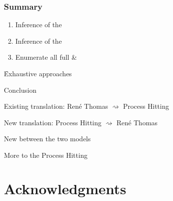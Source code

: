 
\begin{frame}[c]
  \frametitle{Summary}

\begin{enumerate}[1.]
  \item Inference of the 
  \item Inference of the 
  \item Enumerate all full \& 
\end{enumerate}
\quad\quad\f Exhaustive approaches

\pause
\bigskip
\begin{flushright}
\Large
\textcolor{couleurtheme}{Conclusion}\hspace*{2.7em}
\end{flushright}

\medskip
Existing translation: René Thomas $\rightsquigarrow$ Process Hitting

\smallskip
New translation: Process Hitting $\rightsquigarrow$ René Thomas

\smallskip
\begin{fleches}
  \item New  between the two models
  \item More  to the Process Hitting
\end{fleches}
\end{frame}



\section[x]{Acknowledgments}

